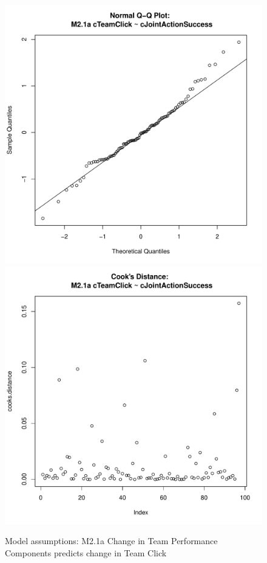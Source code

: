 {\begin{figure}[htbp]
   \includegraphics[scale =.4]{images/MLM21aQQNorm.pdf}
   \includegraphics[scale =.4]{images/MLM21aCooksD.pdf}
   \caption{Model assumptions: M2.1a Change in Team Performance Components predicts change in Team Click}
   \label{fig:MLM21aAssumptions}
 \end{figure}



}
